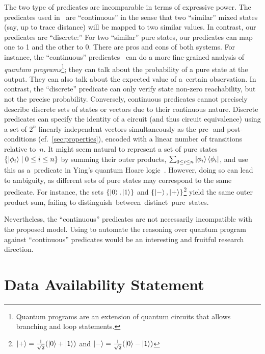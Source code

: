 The two type of predicates are incomparable in terms of expressive power. The
predicates used in~\cite{d2006quantum} are ``continuous'' in the sense that two
``similar'' mixed states (say, up to trace distance) will be mapped to two
similar values.
In contrast, our predicates are ``discrete:'' For two ``similar'' pure states,
our predicates can map one to 1 and the other to 0.
There are pros and cons of both systems.
For instance, the ``continuous'' predicates~\cite{ying2012floyd,d2006quantum}
can do a more fine-grained analysis of \emph{quantum programs}\footnote{Quantum
programs are an
extension of quantum circuits that allows branching and loop statements.}; they can
talk about the probability of a pure state at the output.
They can also talk about the expected value of a~certain observation.
In contrast, the ``discrete'' predicate can only verify state non-zero
reachability, but not the precise probability.
Conversely, continuous predicates cannot precisely describe discrete sets of
states or vectors due to their continuous nature. 
Discrete predicates can specify the identity of a circuit (and thus circuit equivalence) using a set of $2^n$ linearly independent vectors simultaneously as the pre- and post-conditions (cf.~\cref{sec:properties}), encoded with a linear number of transitions relative to~$n$. 
It might seem natural to represent a set of pure states $\{\ket{\phi_i} \mid 0 \leq i \leq n\}$ by summing their outer products, $\sum_{0 \leq i \leq n} \ket{\phi_i}\bra{\phi_i}$, and use this as a~predicate in Ying's quantum Hoare logic~\cite{ying2012floyd}. However, doing so can lead to ambiguity, as different sets of pure states may correspond to the same predicate. For instance, the sets $\{\ket{0}, \ket{1}\}$ and $\{\ket{-}, \ket{+}\}$\footnote{$\ket{+}=\frac{1}{\sqrt{2}}(\ket{0}+\ket{1})$ and $\ket{-}=\frac{1}{\sqrt{2}}(\ket{0}-\ket{1})$} yield the same outer product sum, failing to \mbox{distinguish between distinct pure states.}

Nevertheless, the ``continuous'' predicates are not necessarily incompatible
with the proposed \lsta model.
Using \lstas to automate the reasoning over quantum program against
``continuous'' predicates would be an interesting and fruitful research
direction.

\vspace{-0.0mm}
\section*{Data Availability Statement}\label{sec:label}
\vspace{-0.0mm}

